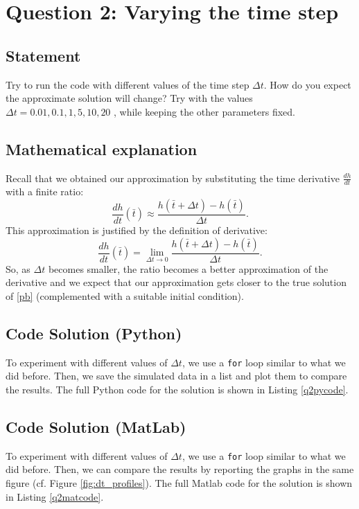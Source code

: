 \documentclass{article}
\newcommand{\py}[1]{\texttt{\lstinline!#1!}}
\begin{document}
\section{Question 2: Varying the time step}
\subsection{Statement}
Try to run the code with different values of the time step $\Delta t$. How do you expect the approximate solution will change? Try with the values $\Delta t = 0.01, 0.1, 1, 5, 10, 20$ , while keeping the other parameters fixed.

\subsection{Mathematical explanation}
Recall that we obtained our approximation by substituting the time derivative $\frac{dh}{dt}$ with a finite ratio:
\begin{equation}
    \frac{dh}{dt}(\bar{t}) \approx \frac{h(\bar{t} +\Delta t) -h(\bar{t})}{\Delta t}.
\end{equation}
This approximation is justified by the definition of derivative:
\begin{equation}
    \frac{dh}{dt}(\bar{t}) = \lim_{\Delta t \rightarrow0}\frac{h(\bar{t} +\Delta t) -h(\bar{t})}{\Delta t}.
\end{equation}
So, as $\Delta t$ becomes smaller, the ratio becomes a better approximation of the derivative and we expect that our approximation gets closer to the true solution of \eqref{pb} (complemented with a suitable initial condition).

\subsection{Code Solution (Python)}
To experiment with different values of $\Delta t$, we use a \py{for} loop similar to what we did before. Then, we save the simulated data in a list and plot them to compare the results. The full Python code for the solution is shown in Listing \ref{q2pycode}.




\subsection{Code Solution (MatLab)}
To experiment with different values of $\Delta t$, we use a \py{for} loop similar to what we did before. Then, we can compare the results by reporting the graphs in the same figure (cf. Figure \ref{fig:dt_profiles}). The full Matlab code for the solution is shown in Listing \ref{q2matcode}.

\end{document}

